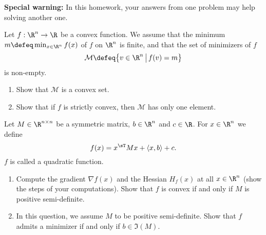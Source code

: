 \documentclass[11pt,nocut]{article}
\begin{document}




\hspace{-0.6cm}\textbf{Special warning:} In this homework, your answers from one problem may help solving another one.


\begin{problem}[2 points]
	Let $f: \R^n \to \R$ be a convex function. We assume that the minimum $m \defeq \min_{x \in \R^n} f(x)$ of $f$ on $\R^n$ is finite, and that the set of minimizers of $f$
$$
\mathcal{M} \defeq \big\{ v \in \R^n \, \big| \, f(v) = m \big\}
$$
is non-empty.

	\begin{enumerate}[label=\normalfont(\textbf{\alph*})]
		\item Show that $\mathcal{M}$ is a convex set.
		\item Show that if $f$ is strictly convex, then $\mathcal{M}$ has only one element.
	\end{enumerate}

\end{problem}

\vspace{4mm}

\begin{problem}[2 points]
	Let $M \in \R^{n \times n}$ be a symmetric matrix, $b \in \R^n$ and $c \in \R$.
	For $x \in \R^n$ we define
	$$
	f(x) = x^{\sT} M x + \langle x,b \rangle + c.
	$$
	$f$ is called a quadratic function.
	\begin{enumerate}[label=\normalfont(\textbf{\alph*})]
		\item Compute the gradient $\nabla f(x)$ and the Hessian $H_f(x)$ at all $x \in \R^n$ (show the steps of your computations). Show that $f$ is convex if and only if $M$ is positive semi-definite.
		\item In this question, we assume $M$ to be positive semi-definite. Show that $f$ admits a minimizer if and only if $b \in \Im(M)$.
	\end{enumerate}
\end{problem}

\newpage
\end{document}
